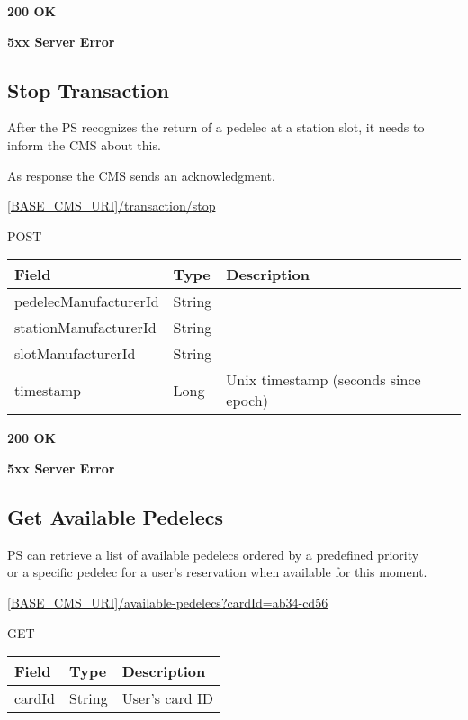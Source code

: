  \textbf{200 OK}

 \textbf{5xx Server Error}

\subsection{Stop Transaction}

After the \acs{PS} recognizes the return of a pedelec at a station slot, it needs to inform the \acs{CMS} about this.

As response the \acs{CMS} sends an acknowledgment.

 \url{[BASE_CMS_URI]/transaction/stop}

 POST

\begin{table}[!h]
\vspace{-7mm}
\begin{tabularx}{\linewidth}{ | l | l | X | }
  \hline
  \rowcolor{table-head}
  Field & Type & Description \\
  \hline
  	pedelecManufacturerId			& String & \\
  	stationManufacturerId			& String & \\
  	slotManufacturerId			& String & \\
  	timestamp					& Long & Unix timestamp (seconds since epoch) \\
  	
    \hline
\end{tabularx}
\end{table}

 \textbf{200 OK}

 \textbf{5xx Server Error}

\subsection{Get Available Pedelecs}

\acs{PS} can retrieve a list of available pedelecs ordered by a predefined priority\\ or a specific pedelec for a user's reservation when available for this moment.

 \url{[BASE_CMS_URI]/available-pedelecs?cardId=ab34-cd56}

 GET

\begin{table}[!h]
\vspace{-7mm}
\begin{tabularx}{\linewidth}{ | l | l | X | }
  \hline
  \rowcolor{table-head}
  Field & Type & Description \\
  \hline
  	cardId & String & User's card ID\\
    \hline
\end{tabularx}
\end{table}


